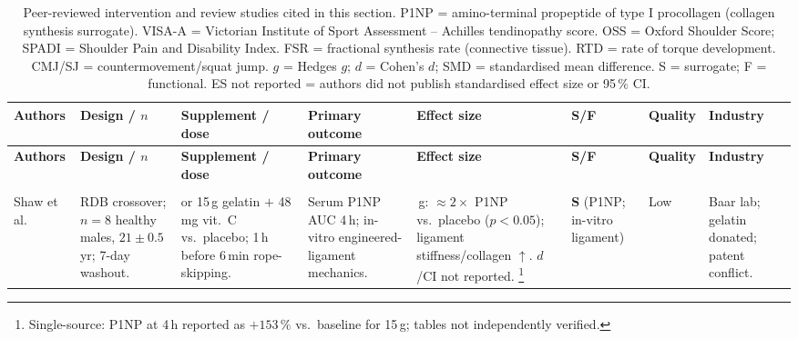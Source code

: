 {\footnotesize
\setlength{\tabcolsep}{4pt}
\renewcommand{\arraystretch}{1.2}
\begin{longtable}{>{\raggedright\arraybackslash}p{2.0cm}
                  >{\raggedright\arraybackslash}p{2.0cm}
                  >{\raggedright\arraybackslash}p{2.0cm}
                  >{\raggedright\arraybackslash}p{2.2cm}
                  >{\raggedright\arraybackslash}p{2.5cm}
                  >{\raggedright\arraybackslash}p{1.2cm}
                  >{\raggedright\arraybackslash}p{1.2cm}
                  >{\raggedright\arraybackslash}p{1.0cm}}
\caption{Peer-reviewed intervention and review studies cited in this section.
         P1NP = amino-terminal propeptide of type I procollagen (collagen synthesis surrogate).
         VISA-A = Victorian Institute of Sport Assessment -- Achilles tendinopathy score.
         OSS = Oxford Shoulder Score; SPADI = Shoulder Pain and Disability Index.
         FSR = fractional synthesis rate (connective tissue).
         RTD = rate of torque development.
         CMJ/SJ = countermovement/squat jump.
         $g$ = Hedges $g$; $d$ = Cohen's $d$; SMD = standardised mean difference.
         S = surrogate; F = functional.
         ES not reported = authors did not publish standardised effect size or 95\,\% CI.}\label{tab:suppstudy}\\
\toprule
\textbf{Authors} & \textbf{Design / $n$} & \textbf{Supplement / dose} & \textbf{Primary outcome} & \textbf{Effect size} & \textbf{S/F} & \textbf{Quality} & \textbf{Industry} \\
\midrule
\endfirsthead
\toprule
\textbf{Authors} & \textbf{Design / $n$} & \textbf{Supplement / dose} & \textbf{Primary outcome} & \textbf{Effect size} & \textbf{S/F} & \textbf{Quality} & \textbf{Industry} \\
\midrule
\endhead
\midrule
\multicolumn{8}{r}{\itshape Continued on next page}\\
\endfoot
\bottomrule
\endlastfoot

Shaw et al.\ \cite{SLBR+17}
&
RDB crossover; $n=8$ healthy males, $21{\pm}0.5$\,yr; 7-day washout.
&
5 or 15\,g gelatin $+$ 48\,mg vit.~C vs.\ placebo; 1\,h before 6\,min rope-skipping.
&
Serum P1NP AUC 4\,h; in-vitro engineered-ligament mechanics.
&
15\,g: ${\approx}2{\times}$ P1NP vs.\ placebo ($p{<}0.05$); ligament stiffness/collagen $\uparrow$. $d$/CI not reported.%
\footnote{Single-source: P1NP at 4\,h reported as $+153\,\%$ vs.\ baseline for 15\,g; tables not independently verified.}
&
\textbf{S} (P1NP; in-vitro ligament)
&
Low
&
Baar lab; gelatin donated; patent conflict.\\


\end{longtable}}
